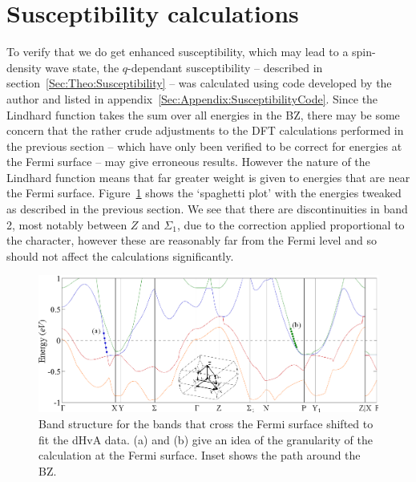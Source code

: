 
\section{Susceptibility calculations}
    \label{Sec:ResD:SubsceptibilityCalculation}

To verify that we do get enhanced susceptibility, which may lead to a spin-density wave state, the $q$-dependant susceptibility -- described in section~\ref{Sec:Theo:Susceptibility} -- was calculated using code developed by the author and listed in appendix~\ref{Sec:Appendix:SusceptibilityCode}. Since the Lindhard function takes the sum over all energies in the \ac{BZ}, there may be some concern that the rather crude adjustments to the \ac{DFT} calculations performed in the previous section -- which have only been verified to be correct for energies at the Fermi surface -- may give erroneous results. However the nature of the Lindhard function means that far greater weight is given to energies that are near the Fermi surface. Figure~\ref{Fig:ResD:ShiftedBandStructure} shows the `spaghetti plot' with the energies tweaked as described in the previous section. We see that there are discontinuities in band 2, most notably between $Z$ and $\Sigma_1$, due to the correction applied proportional to the \DzTwo{} character, however these are reasonably far from the Fermi level and so should not affect the calculations significantly.
\begin{figure}[htbp]
    \begin{center}
        \includegraphics[scale=0.9]{Chapter-dHvABaFe2P2/Figures/AngleDepMeasurements/ShiftedBandStructure/ShiftedBandStructure}
        \caption{Band structure for the bands that cross the Fermi surface shifted to fit the dHvA data. (a) and (b) give an idea of the granularity of the \WIEN{} calculation at the Fermi surface. Inset shows the path around the \ac{BZ}.}
        \label{Fig:ResD:ShiftedBandStructure}
    \end{center}
\end{figure}


